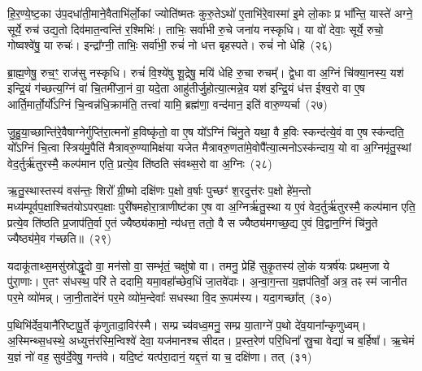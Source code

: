 हि॒र॒ण्ये॒ष्ट॒का उ॑प॒दधा॑ती॒माने॒वैताभि॑र्लो॒कां ज्योति॑ष्मतः कुरु॒ते\-ऽथो॑ ए॒ताभि॑रे॒वास्मा॑ इ॒मे लो॒काः प्र भा᳚न्ति॒ यास्ते॑ अग्ने॒ सूर्ये॒ रुच॑ उद्य॒तो दिव॑मात॒न्वन्ति॑ र॒श्मिभिः॑। ताभिः॒ सर्वा॑भी रु॒चे जना॑य नस्कृधि। या वो॑ देवाः॒ सूर्ये॒ रुचो॒ गोष्वश्वे॑षु॒ या रुचः॑। इन्द्रा᳚ग्नी॒ ताभिः॒ सर्वा॑भी॒ रुचं॑ नो धत्त बृहस्पते। रुचं॑ नो धेहि~(२६)

ब्रा॒ह्म॒णेषु॒ रुच॒ꣳ॒ राज॑सु नस्कृधि। रुचं॑ वि॒श्ये॑षु शू॒द्रेषु॒ मयि॑ धेहि रु॒चा रुचम्᳚। द्वे॒धा वा अ॒ग्निं चि॑क्या॒नस्य॒ यश॑ इन्द्रि॒यं ग॑च्छत्य॒ग्निं वा॑ चि॒तमी॑जा॒नं वा॒ यदे॒ता आहु॑तीर्जु॒होत्या॒त्मन्ने॒व यश॑ इन्द्रि॒यं ध॑त्त ईश्व॒रो वा ए॒ष आर्ति॒मार्तो॒र्यो᳚\-ऽग्निं चि॒न्वन्न॑धि॒क्राम॑ति॒ तत्त्वा॑ यामि॒ ब्रह्म॑णा॒ वन्द॑मान॒ इति॑ वारु॒ण्यर्चा~(२७)

जु॒हु॒या॒च्छान्ति॑रे॒वैषाग्नेर्गुप्ति॑रा॒त्मनो॑ ह॒विष्कृ॑तो॒ वा ए॒ष यो᳚\-ऽग्निं चि॑नु॒ते यथा॒ वै ह॒विः स्कन्द॑त्ये॒वं वा ए॒ष स्क॑न्दति॒ यो᳚\-ऽग्निं चि॒त्वा स्त्रिय॑मु॒पैति॑ मैत्रावरु॒ण्यामिक्ष॑या यजेत मैत्रावरु॒णता॑मे॒वोपै᳚त्या॒त्मनो\-ऽस्क॑न्दाय॒ यो वा अ॒ग्निमृ॑तु॒स्थां वेद॒र्तुर्\mbox{}ऋ॑तुरस्मै॒ कल्प॑मान एति॒ प्रत्ये॒व ति॑ष्ठति संवथ्स॒रो वा अ॒ग्निः~(२८)

ऋ॒तु॒स्थास्तस्य॑ वस॑न्तः॒ शिरो᳚ ग्री॒ष्मो दक्षि॑णः प॒क्षो व॒र्\mbox{}षाः पुच्छꣳ॑ श॒रदुत्त॑रः प॒क्षो हे॑म॒न्तो मध्य॑म्पूर्वप॒क्षाश्चित॑यो\-ऽपरप॒क्षाः पुरी॑षमहोरा॒त्राणीष्ट॑का ए॒ष वा अ॒ग्निर्\mbox{}ऋ॑तु॒स्था य ए॒वं वेद॒र्तुर्\mbox{}ऋ॑तुरस्मै॒ कल्प॑मान एति॒ प्रत्ये॒व ति॑ष्ठति प्र॒जाप॑ति॒र्वा ए॒तं ज्यैष्ठ्य॑कामो॒ न्य॑धत्त॒ ततो॒ वै स ज्यैष्ठ्य॑मगच्छ॒द्य ए॒वं वि॒द्वान॒ग्निं चि॑नु॒ते ज्यैष्ठ्य॑मे॒व ग॑च्छति॥~(२९)

{\anuvakamend[{पृ॒थि॒वीं य॑च्छ॒ यथ्स्व॑यमातृ॒ण्णा उ॑प॒धाय॑ धेह्यृ॒चाग्निश्चि॑नु॒ते त्रीणि॑ च}]}%

यदाकू॑ताथ्स॒मसु॑स्रोद्धृ॒दो वा॒ मन॑सो वा॒ सम्भृ॑तं॒ चक्षु॑षो वा। तमनु॒ प्रेहि॑ सुकृ॒तस्य॑ लो॒कं यत्रर्\mbox{}ष॑यः प्रथम॒जा ये पु॑रा॒णाः। ए॒तꣳ स॑धस्थ॒ परि॑ ते ददामि॒ यमा॒वहा᳚च्छेव॒धिं जा॒तवे॑दाः। अ॒न्वा॒ग॒न्ता य॒ज्ञप॑तिर्वो॒ अत्र॒ तꣴ स्म॑ जानीत पर॒मे व्यो॑मन्न्। जा॒नी॒तादे॑नं पर॒मे व्यो॑म॒न्देवाः᳚ सधस्था वि॒द रू॒पम॑स्य। यदा॒गच्छा᳚त्~(३०)

प॒थिभि॑र्देव॒यानै॑रिष्टापू॒र्ते कृ॑णुतादा॒विर॑स्मै। सम्प्र च्य॑वध्व॒मनु॒ सम्प्र या॒ताग्ने॑ प॒थो दे॑व॒याना᳚न्कृणुध्वम्। अ॒स्मिन्थ्स॒धस्थे॒ अध्युत्त॑रस्मि॒न्विश्वे॑ देवा॒ यज॑मानश्च सीदत। प्र॒स्त॒रेण॑ परि॒धिना᳚ स्रु॒चा वेद्या॑ च ब॒र्\mbox{}हिषा᳚। ऋ॒चेमं य॒ज्ञं नो॑ वह॒ सुव॑र्दे॒वेषु॒ गन्त॑वे। यदि॒ष्टं यत्प॑रा॒दानं॒ यद्द॒त्तं या च॒ दक्षि॑णा। तत्~(३१)

